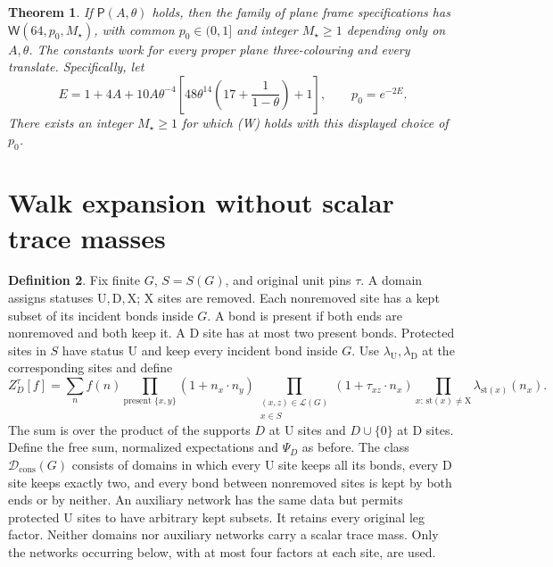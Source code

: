 \documentclass[11pt,reqno]{amsart}
\newtheorem{theorem}{Theorem}[section]
\theoremstyle{definition}
\newtheorem{definition}[theorem]{Definition}
\theoremstyle{remark}
\begin{document}
\begin{theorem}\label{t:cutMOS}
If \(\mathsf P(A,\theta)\) holds, then the family of plane frame
specifications has \(\mathsf W(64,p_0,M_\star)\), with common
\(p_0\in(0,1]\) and integer \(M_\star\ge1\) depending only on
\(A,\theta\). The constants work for every proper plane
three-colouring and every translate.
Specifically, let
\[
 E=1+4A+10A\theta^{-4}
       \left[48\theta^{14}\left(17+\frac1{1-\theta}\right)+1\right],
 \qquad p_0=e^{-2E}.
\]
There exists an integer \(M_\star\ge1\) for which (W) holds
with this displayed choice of \(p_0\).
\end{theorem}


\section{Walk expansion without scalar trace masses}

\begin{definition}\label{d:domain}
Fix finite \(G\), \(S=S(G)\), and original unit pins \(\tau\).
A domain assigns statuses \(\mathrm U,\mathrm D,\mathrm X\);
\(\mathrm X\) sites are removed. Each nonremoved site has a kept
subset of its incident bonds inside \(G\). A bond is present if both
ends are nonremoved and both keep it. A \(\mathrm D\) site has at
most two present bonds. Protected sites in \(S\) have status
\(\mathrm U\) and keep every incident bond inside \(G\).
Use \(\lambda_{\mathrm U},\lambda_{\mathrm D}\) at the corresponding
sites and define
\[
 Z_D^\tau[f]=\sum_n f(n)
       \prod_{\text{present }\{x,y\}}(1+n_x\cdot n_y)
       \prod_{\substack{(x,z)\in\mathcal L(G)\\x\in S}}
                   (1+\tau_{xz}\cdot n_x)
       \prod_{x:\,\mathrm{st}(x)\ne\mathrm X}\lambda_{\mathrm{st}(x)}(n_x).
\]
The sum is over the product of the supports \(D\) at \(\mathrm U\)
sites and \(D\cup\{0\}\) at \(\mathrm D\) sites.
Define the free sum, normalized expectations and \(\Psi_D\) as before.
The class \(\mathcal D_{\mathrm{cons}}(G)\) consists of domains in
which every \(\mathrm U\) site keeps all its bonds, every \(\mathrm D\)
site keeps exactly two, and every bond between nonremoved sites is
kept by both ends or by neither.
An auxiliary network has the same data but permits protected
\(\mathrm U\) sites to have arbitrary kept subsets. It retains every
original leg factor. Neither domains nor auxiliary networks carry
a scalar trace mass. Only the networks occurring below, with at most
four factors at each site, are used.
\end{definition}
\end{document}
